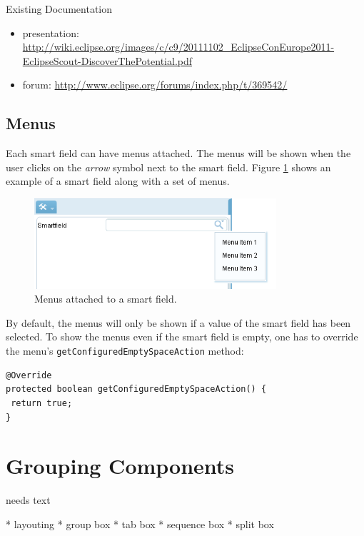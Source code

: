 \documentclass[a4paper,10pt,twoside]{book}
\begin{document}
\noindent Existing Documentation
\begin{itemize}
  \item presentation: \url{http://wiki.eclipse.org/images/c/c9/20111102_EclipseConEurope2011-EclipseScout-DiscoverThePotential.pdf}
  \item forum: \url{http://www.eclipse.org/forums/index.php/t/369542/}
\end{itemize}

\subsection{Menus}
Each smart field can have menus attached. The menus will be shown when the user clicks on the \emph{arrow} symbol next to the smart field. Figure \ref{fig:smartfield_menu} shows an example of a smart field along with a set of menus.
\begin{figure}[!htb]
\centering
\includegraphics[width=0.8\textwidth]{smartfieldmenu.png}
\caption{Menus attached to a smart field.}
\label{fig:smartfield_menu}
\end{figure}

By default, the menus will only be shown if a value of the smart field has been selected. To show the menus even if the smart field is empty, one has to override the menu's \lstinline$getConfiguredEmptySpaceAction$ method:

\begin{lstlisting}[backgroundcolor=\color{white}]
@Override
protected boolean getConfiguredEmptySpaceAction() {
 return true;
}
\end{lstlisting}
	
\section{Grouping Components}
needs text

* layouting
* group box
* tab box
* sequence box 
* split box

\end{document}
